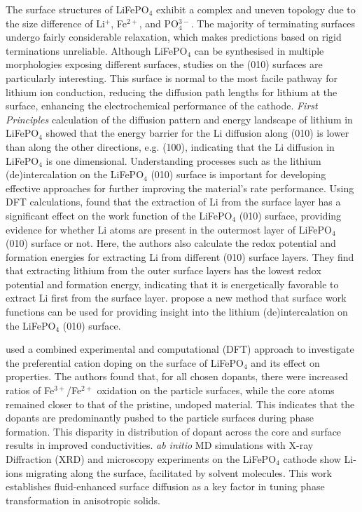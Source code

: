\documentclass[../main.tex]{subfiles}
\begin{document}
The surface structures of LiFePO$_4$ exhibit a complex and uneven topology due to the size difference of Li$^+$, Fe$^{2+}$, and PO$_{4}^{3-}$. The majority of terminating surfaces undergo fairly considerable relaxation, which makes predictions based on rigid terminations unreliable. Although LiFePO$_4$ can be synthesised in multiple morphologies exposing different surfaces,\cite{chen2006electron,ellis2007synthesis} studies on the (010) surfaces are particularly interesting. This surface is normal to the most facile pathway for lithium ion conduction, \cite{islam2010recent} reducing the diffusion path lengths for lithium at the surface, enhancing the electrochemical performance of the cathode. \textit{First Principles} calculation of the diffusion pattern and energy landscape of lithium in LiFePO$_4$ showed that the energy barrier for the Li diffusion along (010) is lower than along the other directions, e.g. (100), indicating that the Li diffusion in LiFePO$_4$ is one dimensional.\cite{tankhilsaikhan2019density} Understanding processes such as the lithium (de)intercalation on the LiFePO$_4$ (010) surface is important for developing effective approaches for further improving the material's rate performance. Using DFT calculations, \citeauthor{xu2019insight} found that the extraction of Li from the surface layer has a significant effect on the work function of the LiFePO$_4$ (010) surface, providing evidence for whether Li atoms are present in the outermost layer of LiFePO$_4$ (010) surface or not.\cite{xu2019insight} Here, the authors also calculate the redox potential and formation energies for extracting Li from different (010) surface layers. They find that extracting lithium from the outer surface layers has the lowest redox potential and formation energy, indicating that it is energetically favorable to extract Li first from the surface layer. \citeauthor{xu2019insight} propose a new method that surface work functions can be used for providing insight into the lithium (de)intercalation on the LiFePO$_4$ (010) surface.\cite{xu2019insight}

\citeauthor{zhang2020observation} used a combined experimental and computational (DFT) approach to investigate the preferential cation doping on the surface of LiFePO$_4$ and its effect on properties.\cite{zhang2020observation} The authors found that, for all chosen dopants, there were increased ratios of Fe$^{3+}$/Fe$^{2+}$ oxidation on the particle surfaces, while the core atoms remained closer to that of the pristine, undoped material. This indicates that the dopants are predominantly pushed to the particle surfaces during phase formation. This disparity in distribution of dopant across the core and surface results in improved conductivities. \cite{zhang2020observation} \textit{ab initio} MD simulations with X-ray Diffraction (XRD) and microscopy experiments on the LiFePO$_4$ cathode show Li-ions migrating along the surface, facilitated by solvent molecules. \cite{li2018fluid} This work establishes fluid-enhanced surface diffusion as a key factor in tuning phase transformation in anisotropic solids.
\end{document}
